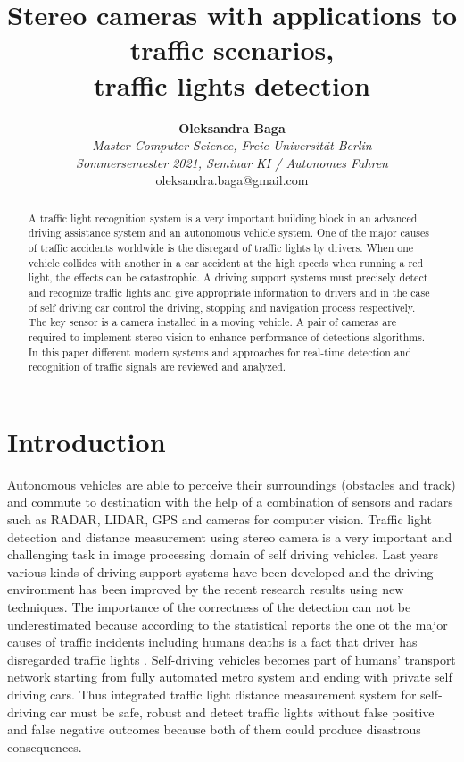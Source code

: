 \documentclass[letterpaper, 10 pt, conference]{ieeeconf} %
\title{\LARGE \bf
Stereo cameras with applications to traffic scenarios,\\ traffic lights detection
}
\author{\textbf{Oleksandra Baga}\\ 
\textit{\small Master Computer Science, Freie Universit\"at Berlin}\\ 
\textit{\small Sommersemester 2021, Seminar KI / Autonomes Fahren}\\
{\small oleksandra.baga@gmail.com}}
\begin{document}
\maketitle

\thispagestyle{empty}
\pagestyle{empty}


\begin{abstract}

A traffic light recognition system is a very important building block in an advanced driving assistance system and an autonomous vehicle system. One of the major causes of traffic accidents worldwide is the disregard of traffic lights by drivers. When one vehicle collides with another in a car accident at the high speeds when running a red light, the effects can be catastrophic. A driving support systems must precisely detect and recognize traffic lights and give appropriate information to drivers and in the case of self driving car control the driving, stopping and navigation process respectively. The key sensor is a camera installed in a moving vehicle. A pair of cameras are required to implement stereo vision to enhance performance of detections algorithms. In this paper different modern systems and approaches for real-time detection and recognition of traffic signals are reviewed and analyzed. 

\end{abstract}


\section{Introduction}
Autonomous vehicles are able to perceive their surroundings (obstacles and track) and commute to destination with the help of a combination of sensors and radars such as RADAR, LIDAR, GPS and cameras for computer vision. Traffic light detection and distance measurement using stereo camera is a very important and challenging task in image processing domain of self driving vehicles. Last years various kinds of driving support systems have been developed and the driving environment has been improved by the recent research results using new techniques. The importance of the correctness of the detection can not be underestimated because according to the statistical reports the one ot the major causes of traffic incidents including humans deaths is a fact that driver has disregarded traffic lights \cite{c3}. Self-driving vehicles becomes part of humans' transport network starting from fully automated metro system and ending with private self driving cars. Thus integrated traffic light distance measurement system for self-driving car must be safe, robust and detect traffic lights without false positive and false negative outcomes because both of them could produce disastrous consequences. 
\end{document}
